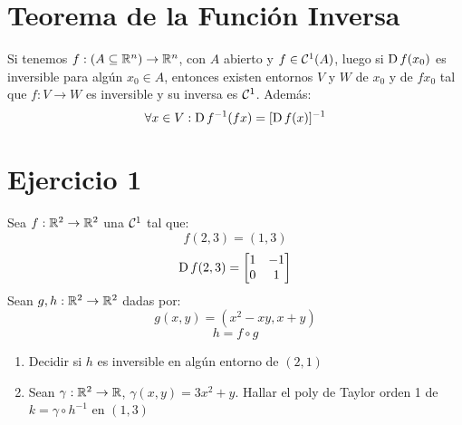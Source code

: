 \documentclass{article}
\begin{document}
	\section*{Teorema de la Función Inversa}
	Si tenemos $f : (A \subseteq \mathbb{R}^n) \to \mathbb{R}^n$, con $A$ abierto y $f \in \mathcal{C}^1(A)$, luego si $\operatorname{D} f(x_0)$ es inversible para algún $x_0 \in A$, entonces existen entornos $V$ y $W$ de $x_0$ y de $fx_0$ tal que $f : V \to W$ es inversible y su inversa es $\mathcal{C}^1$. Además:
	\[
		\forall x \in V : \operatorname{D} f^{-1} (fx) = [\operatorname{D} f(x)]^{-1}
	\]

	\section*{Ejercicio 1}
	Sea $f : \mathbb{R}^2 \to \mathbb{R}^2$ una $\mathcal{C}^1$ tal que:
	\[
		f(2,3) = (1,3)
	\]
	\[
		\operatorname{D} f(2,3) =
		\begin{bmatrix}
			1 & -1 \\ 0 & 1
		\end{bmatrix}
	\]
	Sean $g, h : \mathbb{R}^2 \to \mathbb{R}^2$ dadas por:
	\[
		g(x,y) = (x^2-xy, x+y)
	\]
	\[
		h = f \circ g
	\]
	\begin{enumerate}
		\item Decidir si $h$ es inversible en algún entorno de $(2,1)$
		\item Sean $\gamma : \mathbb{R}^2 \to \mathbb{R}$, $\gamma (x,y) = 3x^2+y$. Hallar el poly de Taylor orden 1 de $k = \gamma \circ h^{-1}$ en $(1,3)$
	\end{enumerate}
\end{document}
